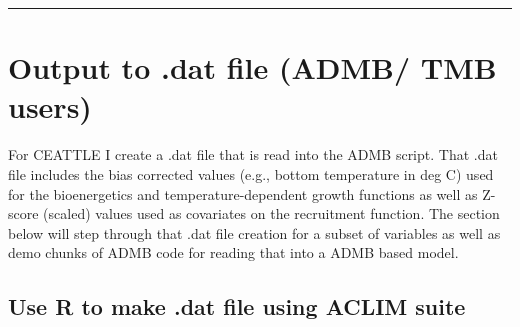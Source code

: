 \documentclass[
]{article}
\begin{document}
\begin{center}\rule{0.5\linewidth}{0.5pt}\end{center}

\hypertarget{output-to-.dat-file-admb-tmb-users}{%
\section{Output to .dat file (ADMB/ TMB
users)}\label{output-to-.dat-file-admb-tmb-users}}

For CEATTLE I create a .dat file that is read into the ADMB script. That
.dat file includes the bias corrected values (e.g., bottom temperature
in deg C) used for the bioenergetics and temperature-dependent growth
functions as well as Z-score (scaled) values used as covariates on the
recruitment function. The section below will step through that .dat file
creation for a subset of variables as well as demo chunks of ADMB code
for reading that into a ADMB based model.

\hypertarget{use-r-to-make-.dat-file-using-aclim-suite}{%
\subsection{Use R to make .dat file using ACLIM
suite}\label{use-r-to-make-.dat-file-using-aclim-suite}}
\end{document}
